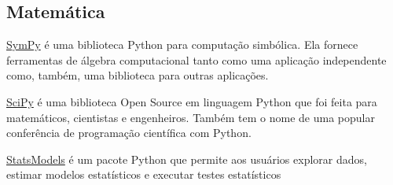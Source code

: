 \subsection*{Matemática}

\underline{SymPy} é uma biblioteca Python para computação simbólica. 
Ela fornece ferramentas de álgebra computacional tanto como uma aplicação independente como, também, uma biblioteca para outras aplicações.

\underline{SciPy} é uma biblioteca Open Source em linguagem Python que foi feita para matemáticos, cientistas e engenheiros. 
Também tem o nome de uma popular conferência de programação científica com Python.

\underline{StatsModels} é um pacote Python que permite aos usuários explorar dados, estimar modelos estatísticos e executar testes estatísticos
